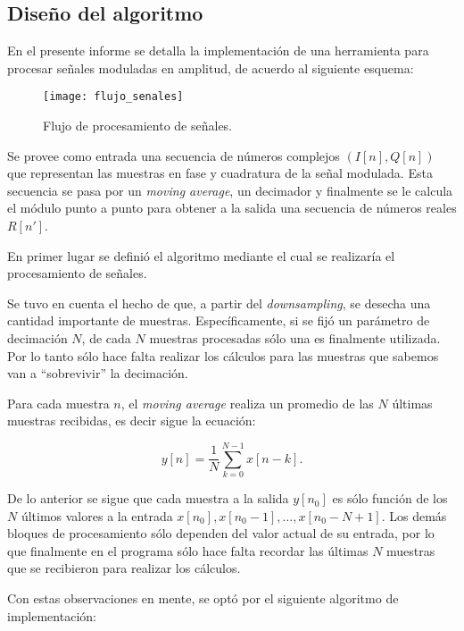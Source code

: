 \subsection{Diseño del algoritmo}

En el presente informe se detalla la implementación de una herramienta para procesar señales moduladas en amplitud, de acuerdo al siguiente esquema:

\begin{figure}[h]
\centering
\texttt{[image: flujo\_senales]}
\caption{Flujo de procesamiento de señales.}
\label{fig:flujo_senales}
\end{figure}

Se provee como entrada una secuencia de números complejos $(I[n],Q[n])$ que representan las muestras en fase y cuadratura de la señal modulada. Esta secuencia se pasa por un \textit{moving average}, un decimador y finalmente se le calcula el módulo punto a punto para obtener a la salida una secuencia de números reales $R[n']$.

En primer lugar se definió el algoritmo mediante el cual se realizaría el procesamiento de señales. 

Se tuvo en cuenta el hecho de que, a partir del \textit{downsampling}, se desecha una cantidad importante de muestras. Específicamente, si se fijó un parámetro de decimación $N$, de cada $N$ muestras procesadas sólo una es finalmente utilizada. Por lo tanto sólo hace falta realizar los cálculos para las muestras que sabemos van a ``sobrevivir'' la decimación.

Para cada muestra $n$, el \textit{moving average} realiza un promedio de las $N$ últimas muestras recibidas, es decir sigue la ecuación:

	\begin{equation*}
		 y[n] = \frac1N \sum_{k = 0}^{N-1} x[n-k]. 
	\end{equation*}

De lo anterior se sigue que cada muestra a la salida $y[n_0]$ es sólo función de los $N$ últimos valores a la entrada $x[n_0], x[n_0 - 1], \dots,  x[n_0 - N + 1]$. Los demás bloques de procesamiento sólo dependen del valor actual de su entrada, por lo que finalmente en el programa sólo hace falta recordar las últimas $N$ muestras que se recibieron para realizar los cálculos. 

Con estas observaciones en mente, se optó por el siguiente algoritmo de implementación:

